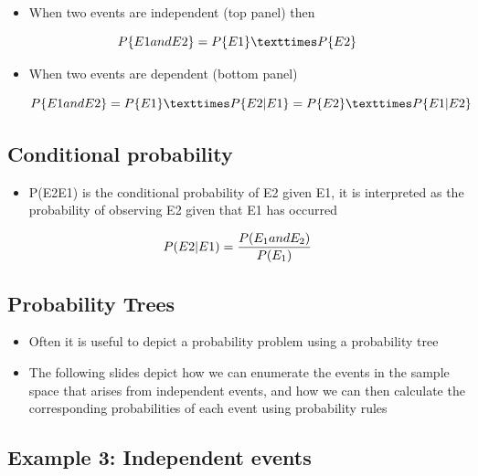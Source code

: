 \documentclass[
]{book}
\providecommand{\tightlist}{%
  \setlength{\itemsep}{0pt}\setlength{\parskip}{0pt}}
\begin{document}
\begin{itemize}
\tightlist
\item
  When two events are independent (top panel) then
\end{itemize}

\[P\{E1 \space and \space E2\} = P\{E1\} × P\{E2\}\]

\begin{itemize}
\item
  When two events are dependent (bottom panel)

  \[P\{E1 \space and \space E2\} = P\{E1\} × P\{E2|E1\} = P\{E2\} × P\{E1|E2\}\]
\end{itemize}

\hypertarget{conditional-probability}{%
\subsection{Conditional probability}\label{conditional-probability}}

\begin{itemize}
\tightlist
\item
  P(E2\textbar E1) is the conditional probability of E2 given E1, it is interpreted as the probability of observing E2 given that E1 has occurred
\end{itemize}

\[P(E2|E1) = \frac{P(E_1 \space and \space E_2)}{P(E_1)}\]

\hypertarget{probability-trees}{%
\subsection{Probability Trees}\label{probability-trees}}

\begin{itemize}
\tightlist
\item
  Often it is useful to depict a probability problem using a probability tree
\item
  The following slides depict how we can enumerate the events in the sample space that arises from independent events, and how we can then calculate the corresponding probabilities of each event using probability rules
\end{itemize}

\hypertarget{example-3-independent-events}{%
\subsection{Example 3: Independent events}\label{example-3-independent-events}}
\end{document}
